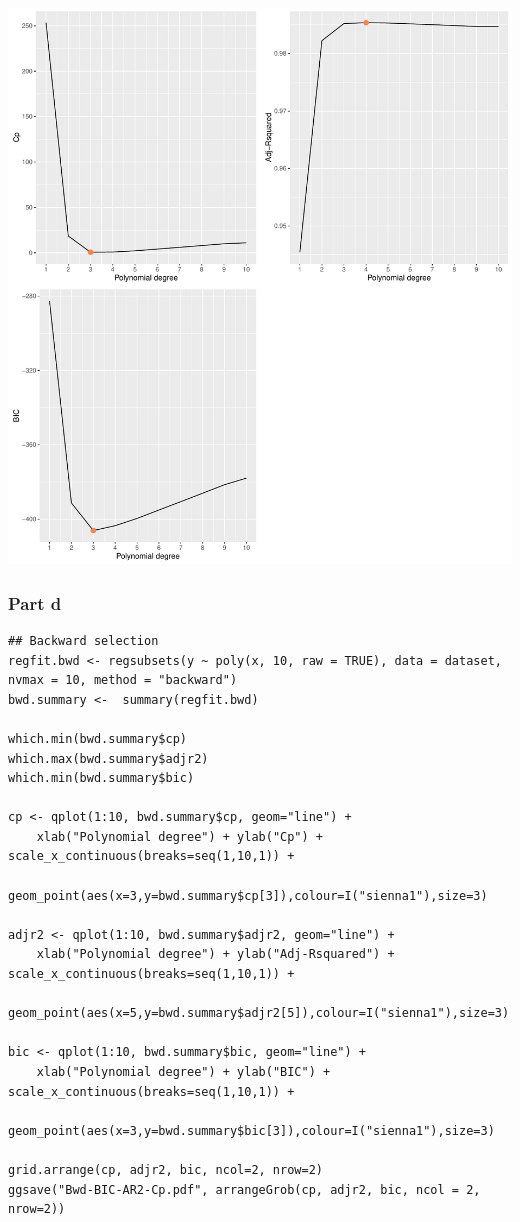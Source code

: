 \documentclass[11pt, a4paper]{article}
\begin{document}
\includegraphics[scale=0.55]{Fwd-BIC-AR2-Cp.pdf}
\subsubsection{Part d}
\label{sec-2-1-3}


\begin{verbatim}
## Backward selection
regfit.bwd <- regsubsets(y ~ poly(x, 10, raw = TRUE), data = dataset, nvmax = 10, method = "backward")
bwd.summary <-  summary(regfit.bwd)

which.min(bwd.summary$cp)
which.max(bwd.summary$adjr2)
which.min(bwd.summary$bic)

cp <- qplot(1:10, bwd.summary$cp, geom="line") +
    xlab("Polynomial degree") + ylab("Cp") + scale_x_continuous(breaks=seq(1,10,1)) +
    geom_point(aes(x=3,y=bwd.summary$cp[3]),colour=I("sienna1"),size=3)

adjr2 <- qplot(1:10, bwd.summary$adjr2, geom="line") +
    xlab("Polynomial degree") + ylab("Adj-Rsquared") + scale_x_continuous(breaks=seq(1,10,1)) +
    geom_point(aes(x=5,y=bwd.summary$adjr2[5]),colour=I("sienna1"),size=3)

bic <- qplot(1:10, bwd.summary$bic, geom="line") +
    xlab("Polynomial degree") + ylab("BIC") + scale_x_continuous(breaks=seq(1,10,1)) +
    geom_point(aes(x=3,y=bwd.summary$bic[3]),colour=I("sienna1"),size=3)

grid.arrange(cp, adjr2, bic, ncol=2, nrow=2)
ggsave("Bwd-BIC-AR2-Cp.pdf", arrangeGrob(cp, adjr2, bic, ncol = 2, nrow=2))
\end{verbatim}
\end{document}
